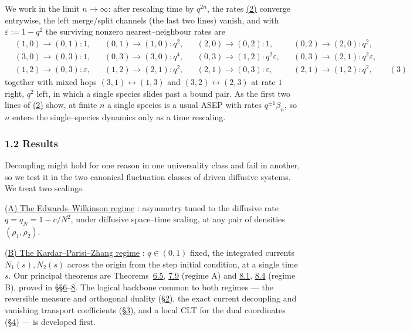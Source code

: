 \documentclass[11pt]{article}
\theoremstyle{plain}
\theoremstyle{definition}
\theoremstyle{remark}
\newcommand{\eps}{\varepsilon}\newcommand{\Exp}{\mathrm{Exp}}
\begin{document}
We work in the limit $n\to\infty$: after rescaling time by $q^{2n}$, the rates
\hyperref[eq_nrates]{(2)} converge entrywise, the left merge/split channels (the last two
lines) vanish, and with $\eps:=1-q^2$ the surviving nonzero nearest--neighbour rates
are
\label{eq_rates}
\begin{equation}
\begin{aligned}
&(1,0)\!\to\!(0,1):1, &&(0,1)\!\to\!(1,0):q^2, &&(2,0)\!\to\!(0,2):1, &&(0,2)\!\to\!(2,0):q^2,\\
&(3,0)\!\to\!(0,3):1, &&(0,3)\!\to\!(3,0):q^4, &&(0,3)\!\to\!(1,2):q^2\eps, &&(0,3)\!\to\!(2,1):q^2\eps,\\
&(1,2)\!\to\!(0,3):\eps, &&(1,2)\!\to\!(2,1):q^2, &&(2,1)\!\to\!(0,3):\eps, &&(2,1)\!\to\!(1,2):q^2,
\qquad(3)
\end{aligned}
\end{equation}
together with mixed hops $(3,1)\!\leftrightarrow\!(1,3)$ and
$(3,2)\!\leftrightarrow\!(2,3)$ at rate $1$ right, $q^2$ left, in which a single
species slides past a bound pair. As the first two lines of \hyperref[eq_nrates]{(2)} show,
at finite $n$ a single species is a usual ASEP with rates $q^{\pm1}\beta_n$, so $n$
enters the single--species dynamics only as a time rescaling.

\subsubsection{1.2 Results}\label{sec_introresults}
Decoupling might hold for one reason in one universality class and fail in another, so
we test it in the two canonical fluctuation classes of driven diffusive systems. We
treat two scalings. 

\underline{(A) The Edwards--Wilkinson regime} \cite{EW}: asymmetry tuned to
the diffusive rate $q=q_N=1-c/N^2$, under diffusive space--time scaling, at any pair of
densities $(\rho_1,\rho_2)$. 

\underline{(B) The Kardar--Parisi--Zhang
regime} \cite{KPZ}: $q\in(0,1)$ fixed, the integrated currents $N_1(s),N_2(s)$ across the origin
from the step initial condition, at a single time $s$. Our principal theorems are
Theorems~\hyperref[thm_ewmain]{6.5}, \hyperref[thm_closed]{7.9} (regime A) and \hyperref[thm_marg]{8.1},
\hyperref[thm_cov]{8.4} (regime B), proved in \S\S\hyperref[sec_ew]{6}--\hyperref[sec_tw]{8}. The logical
backbone common to both regimes --- the reversible measure and orthogonal duality
(\S\hyperref[sec_model]{2}), the exact current decoupling and vanishing transport
coefficients (\S\hyperref[sec_decouple]{3}), and a local CLT for the dual coordinates
(\S\hyperref[sec_lclt]{4}) --- is developed first.
\end{document}
